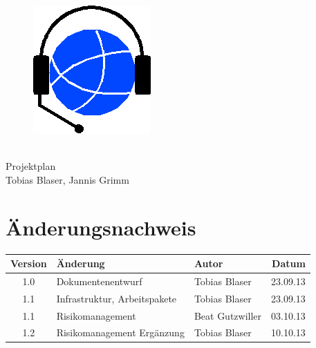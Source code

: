 

\providecommand{\documentType}{Projektplan}
\providecommand{\versionnumber}{1.0}



\thispagestyle{empty}
\begin{titlepage}
	\begin{center}

	\vspace*{40mm}
	
	\begin{figure}[htp]
		\centering
		\includegraphics[scale=0.60]{../img/icon-js-voip.png}
	\end{figure}		
	\vspace*{20mm}
	
	{\fontsize{40}{48} \selectfont \project \\[10mm]}
	{\fontsize{40}{48} \selectfont \documentType \\[5mm]}	
	\vspace*{20mm}
	Tobias Blaser, Jannis Grimm

\end{center}
\end{titlepage}
\clearpage

\chapter*{Änderungsnachweis}
\begin{tabularx}{\textwidth}{|cXlr|} %
		\hline
		\textbf{Version} & \textbf{Änderung} & \textbf{Autor} & \textbf{Datum}\\
		\hline
		1.0 & Dokumentenentwurf & Tobias Blaser & 23.09.13\\
		1.1 & Infrastruktur, Arbeitspakete & Tobias Blaser & 23.09.13\\
		1.1 & Risikomanagement & Beat Gutzwiller & 03.10.13\\
		1.2 & Risikomanagement Ergänzung & Tobias Blaser & 10.10.13\\
		\hline
\end{tabularx}

\tableofcontents








